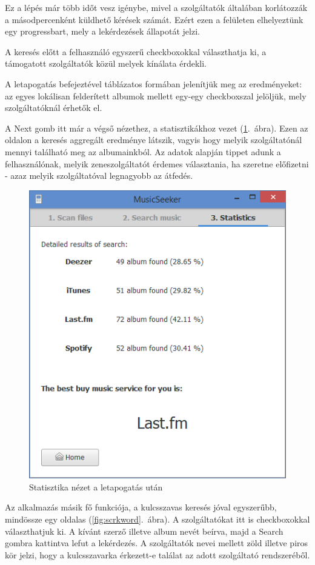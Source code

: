 Ez a lépés már több időt vesz igénybe, mivel a szolgáltatók általában korlátozzák a másodpercenként küldhető kérések számát. Ezért ezen a felületen elhelyeztünk egy progressbart, mely a lekérdezések állapotát jelzi.

A keresés előtt a felhasználó egyszerű checkboxokkal választhatja ki, a támogatott szolgáltatók közül melyek kínálata érdekli.

A letapogatás befejeztével táblázatos formában jelenítjük meg az eredményeket: az egyes lokálisan felderített albumok mellett egy-egy checkboxszal jelöljük, mely szolgáltatóknál érhetők el.

A Next gomb itt már a végső nézethez, a statisztikákhoz vezet (\ref{fig:scrstat}.~ábra). Ezen az oldalon a keresés aggregált eredménye látszik, vagyis hogy melyik szolgáltatónál mennyi található meg az albumainkból.
Az adatok alapján tippet adunk a felhasználónak, melyik zeneszolgáltatót érdemes választania, ha szeretne előfizetni - azaz melyik szolgáltatóval legnagyobb az átfedés.

\begin{figure}[htp]
\centering
\includegraphics[scale=0.4]{img/screenshots/screenshot04.png}
\caption{Statisztika nézet a letapogatás után}
\label{fig:scrstat}
\end{figure}

Az alkalmazás másik fő funkciója, a kulcsszavas keresés jóval egyszerűbb, mindössze egy oldalas (\ref{fig:scrkword}.~ábra). A szolgáltatókat itt is checkboxokkal választhatjuk ki. A kívánt szerző illetve album nevét beírva, majd a Search gombra kattintva lefut a lekérdezés. A szolgáltatók nevei mellett zöld illetve piros kör jelzi, hogy a kulcsszavarka érkezett-e találat az adott szolgáltató rendszeréből.

